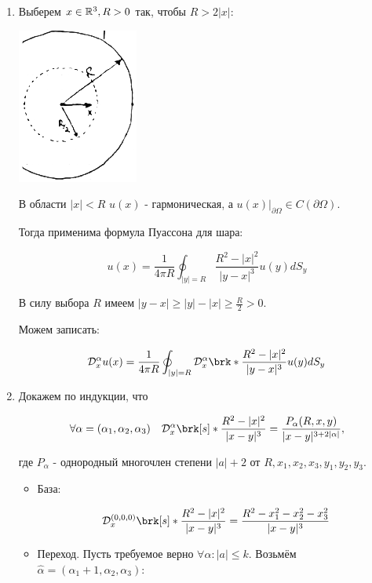 \begin{enumerate}



\item{

Выберем $x \in \mathbb{R}^3, R>0$ так, чтобы $R > 2|x|$:
\begin{center}
\includegraphics{21_1_new}
\end{center}
В области $|x|<R$ $u(x)$ - гармоническая, а $\left. u(x) \right|_{\partial \Omega} \in C(\partial \Omega)$.

Тогда применима формула Пуассона для шара:

$$u(x) = \frac{1}{4 \pi R} \oint_{|y|=R}{\frac{R^2-|x|^2}{|y-x|^3} u(y) dS_y }
$$

В силу выбора $R$ имеем $|y-x| \ge |y|- |x| \ge \frac{R}{2} >0$.

Можем записать:

$$\mathcal{D}_{x}^{\alpha} u(x) = \frac{1}{4 \pi R} 
\oint_{|y|=R}{\mathcal{D}_{x}^{\alpha}\brk*{\frac{R^2-|x|^2}{|y-x|^3}}u(y) dS_y}$$

}





\item{

Докажем по индукции, что
 
$$\forall \alpha = (\alpha_1,\alpha_2,\alpha_3)~~~ \mathcal{D}_{x}^{\alpha}\brk[s]*{\frac{R^2-|x|^2}{|x-y|^3}} = \frac{P_{\alpha}(R,x,y)}{|x-y|^{3+2|\alpha|}},$$

где $P_\alpha$ - однородный многочлен степени $|a|+2$ от $R, x_1,x_2,x_3,y_1,y_2,y_3$.


\begin{itemize}
	\item {База:}
	
	$$\mathcal{D}_{x}^{(0,0,0)}\brk[s]*{\frac{R^2-|x|^2}{|x-y|^3}} = \frac{R^2-x_1^2-x_2^2-x_3^2}{|x-y|^3}$$
	
	\item {Переход. 
Пусть требуемое верно $\forall \alpha: |a|\le k$. Возьмём $\hat{\alpha}=(\alpha_1+1, \alpha_2, \alpha_3)$:}


\end{itemize}}
\end{enumerate}
